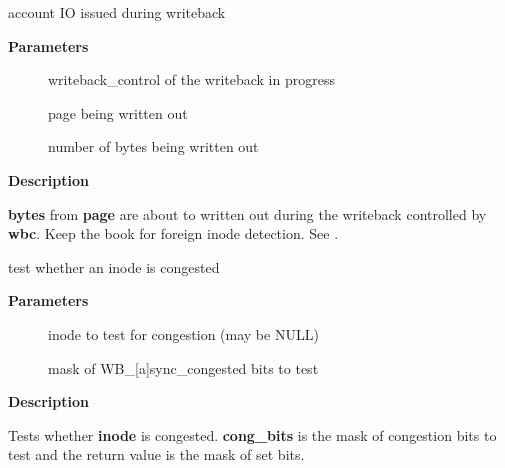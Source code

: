 \documentclass[a4paper,8pt,english]{sphinxmanual}
\begin{document}
\begin{fulllineitems}
\label{filesystems/index:c.wbc_account_io}
account IO issued during writeback

\end{fulllineitems}


\textbf{Parameters}
\begin{description}
\item[{}] \leavevmode
writeback\_control of the writeback in progress

\item[{}] \leavevmode
page being written out

\item[{}] \leavevmode
number of bytes being written out

\end{description}

\textbf{Description}

\textbf{bytes} from \textbf{page} are about to written out during the writeback
controlled by \textbf{wbc}.  Keep the book for foreign inode detection.  See
.

\begin{fulllineitems}
\label{filesystems/index:c.inode_congested}
test whether an inode is congested

\end{fulllineitems}


\textbf{Parameters}
\begin{description}
\item[{}] \leavevmode
inode to test for congestion (may be NULL)

\item[{}] \leavevmode
mask of WB\_{[}a{]}sync\_congested bits to test

\end{description}

\textbf{Description}

Tests whether \textbf{inode} is congested.  \textbf{cong\_bits} is the mask of congestion
bits to test and the return value is the mask of set bits.
\end{document}
